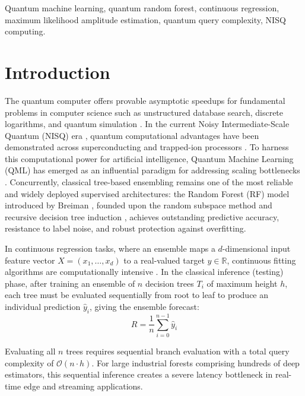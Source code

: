 \documentclass[conference]{IEEEtran}
\begin{document}
\begin{IEEEkeywords}
Quantum machine learning, quantum random forest, continuous regression, maximum likelihood amplitude estimation, quantum query complexity, NISQ computing.
\end{IEEEkeywords}

\section{Introduction}

The quantum computer offers provable asymptotic speedups for fundamental problems in computer science such as unstructured database search, discrete logarithms, and quantum simulation \cite{nielsen2010quantum}. In the current Noisy Intermediate-Scale Quantum (NISQ) era \cite{preskill2018quantum}, quantum computational advantages have been demonstrated across superconducting and trapped-ion processors \cite{arute2019quantum}. To harness this computational power for artificial intelligence, Quantum Machine Learning (QML) has emerged as an influential paradigm for addressing scaling bottlenecks \cite{biamonte2017quantum,cerezo2021variational}. Concurrently, classical tree-based ensembling remains one of the most reliable and widely deployed supervised architectures: the Random Forest (RF) model introduced by Breiman \cite{breiman2001random}, founded upon the random subspace method \cite{ho1998random} and recursive decision tree induction \cite{quinlan1986induction}, achieves outstanding predictive accuracy, resistance to label noise, and robust protection against overfitting.

In continuous regression tasks, where an ensemble maps a $d$-dimensional input feature vector $X = (x_1, \dots, x_d)$ to a real-valued target $y \in \mathbb{R}$, continuous fitting algorithms are computationally intensive \cite{wiebe2012quantum,mitarai2018quantum}. In the classical inference (testing) phase, after training an ensemble of $n$ decision trees $T_i$ of maximum height $h$, each tree must be evaluated sequentially from root to leaf to produce an individual prediction $\hat{y}_i$, giving the ensemble forecast:
\begin{equation}\label{eq1}
R = \frac{1}{n} \sum_{i=0}^{n-1} \hat{y}_i
\end{equation}

Evaluating all $n$ trees requires sequential branch evaluation with a total query complexity of $\mathcal{O}(n \cdot h)$. For large industrial forests comprising hundreds of deep estimators, this sequential inference creates a severe latency bottleneck in real-time edge and streaming applications.
\end{document}
